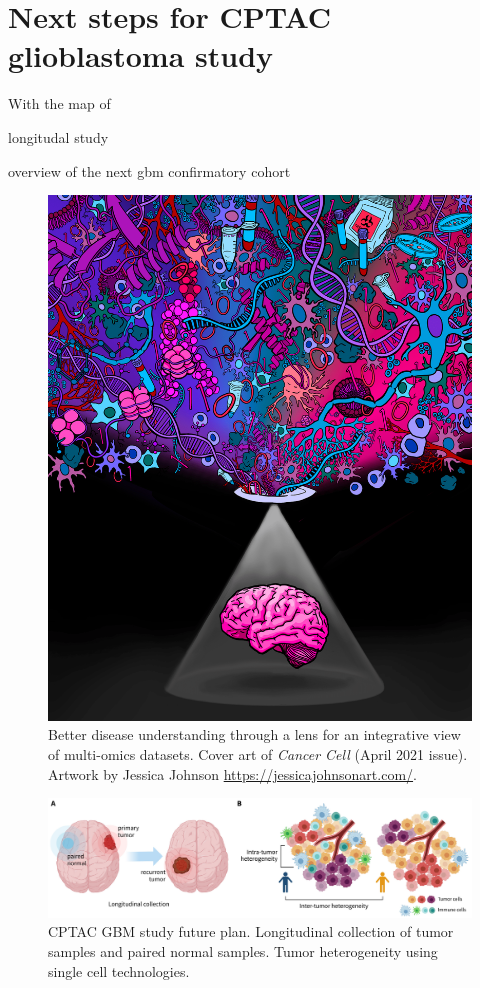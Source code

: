 \section{Next steps for CPTAC glioblastoma study}
With the map of 

longitudal study

overview of the next gbm confirmatory cohort

\begin{figure}[tb]
    \centering
    \includegraphics[width=0.6\linewidth]{figures/chap05_conclusion/cptac_gbm_cancer_cell_cover.png}
    \caption[Better disease understanding through a lens for an integrative view of multi-omics datasets.]{Better disease understanding through a lens for an integrative view of multi-omics datasets. Cover art of \textit{Cancer Cell} (April 2021 issue). Artwork by Jessica Johnson \url{https://jessicajohnsonart.com/}.}
    \label{fig:lens-multi-omics}
\end{figure}

\begin{figure}[tb]
    \centering
    \includegraphics[width=1\linewidth]{figures/chap05_conclusion/gbm_future_plan.pdf}
    \caption[CPTAC GBM study future plan.]{%
        CPTAC GBM study future plan.
         Longitudinal collection of tumor samples and paired normal samples.
         Tumor heterogeneity using single cell technologies.
    }
    \label{fig:cptac-gbm-future-plan}
\end{figure}
